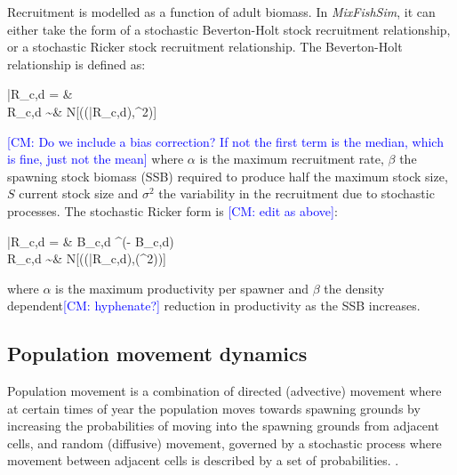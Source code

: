 \documentclass[review]{elsarticle}
\let\oldequation\equation
\let\oldendequation\endequation
\renewenvironment{equation}
 {\linenomathNonumbers\oldequation}
 {\oldendequation\endlinenomath}
\begin{document}
Recruitment is modelled as a function of adult biomass. In
\textit{MixFishSim}, it can either take the form of a stochastic Beverton-Holt
stock recruitment relationship, or a stochastic Ricker stock recruitment
relationship. The Beverton-Holt relationship is defined as\citep{Beverton1957}: 
\begin{equation}
	\begin{split}
	\bar{R}_{c,d} = &  \\
	     \added{\ln(}R_{c,d}\added{)} \sim & \deleted{\log} N[(\replaced{\ln}{\log}(\bar{R}_{c,d}),\sigma^2)]
	\end{split}
\end{equation}
\textcolor{blue}{[CM: Do we include a bias correction? If not the first term is the median, which is fine, just not the mean]}
where $\alpha$ is the maximum recruitment rate, $\beta$ the spawning stock
biomass (SSB) required to produce half the maximum stock size, $S$ current
stock size and $\sigma^2$ the variability in the recruitment due to stochastic
processes. The stochastic Ricker form \citep{Ricker1954} is \textcolor{blue}{[CM: edit as above]}:
\begin{equation}
	\begin{split}
	\bar{R}_{c,d} = & B_{c,d} \cdot {}^{(\alpha - \beta \cdot B_{c,d})} \\	
   	     R_{c,d} \sim & \log N[(\log(\bar{R}_{c,d}),\log(\sigma^2))]
	\end{split}
\end{equation}
where $\alpha$ is the maximum productivity per spawner and $\beta$ the density
dependent\textcolor{blue}{[CM: hyphenate?]} reduction in productivity as the SSB increases. 

\subsection{Population movement dynamics}

Population movement is a combination of directed (advective) movement where at
certain times of year the population moves towards spawning grounds by
increasing the probabilities of moving into the spawning grounds from adjacent
cells, and random (diffusive) movement, governed by a stochastic process where
movement between adjacent cells is described by a set of probabilities.
.\\
\end{document}
